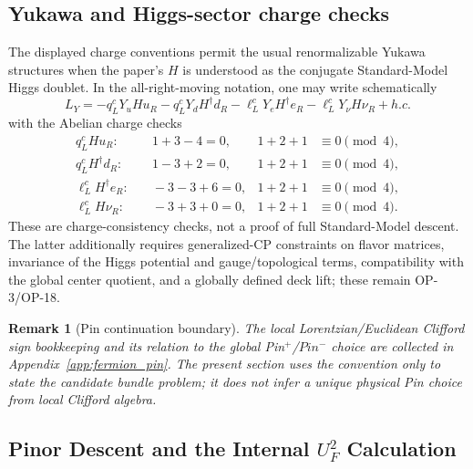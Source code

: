 \documentclass[11pt]{article}
\theoremstyle{canonmath}
\newtheorem{remark}[theorem]{Remark}
\theoremstyle{canonpostulate}
\theoremstyle{canonclaim}
\def\mathrm#1{#1}%
\def\mathcal#1{#1}%
\begin{document}
\subsection{Yukawa and Higgs-sector charge checks}
The displayed charge conventions permit the usual renormalizable Yukawa structures when the paper's $H$ is understood as the conjugate Standard-Model Higgs doublet. In the all-right-moving notation, one may write schematically
\begin{equation}
\mathcal L_Y=-q_L^cY_uHu_R-q_L^cY_dH^\dagger d_R-\ell_L^cY_eH^\dagger e_R-\ell_L^cY_\nu H\nu_R+\mathrm{h.c.}
\label{eq:yukawa}
\end{equation}
with the Abelian charge checks
\begin{equation}
\begin{aligned}
q_L^cHu_R:&\quad 1+3-4=0, &1+2+1&\equiv0\pmod4,\\
q_L^cH^\dagger d_R:&\quad 1-3+2=0, &1+2+1&\equiv0\pmod4,\\
\ell_L^cH^\dagger e_R:&\quad -3-3+6=0, &1+2+1&\equiv0\pmod4,\\
\ell_L^cH\nu_R:&\quad -3+3+0=0, &1+2+1&\equiv0\pmod4.
\end{aligned}
\end{equation}
These are charge-consistency checks, not a proof of full Standard-Model descent. The latter additionally requires generalized-CP constraints on flavor matrices, invariance of the Higgs potential and gauge/topological terms, compatibility with the global center quotient, and a globally defined deck lift; these remain OP-3/OP-18.

\begin{remark}[Pin continuation boundary]
The local Lorentzian/Euclidean Clifford sign bookkeeping and its relation to the global Pin$^+$/$Pin^-$ choice are collected in Appendix~\ref{app:fermion_pin}. The present section uses the convention only to state the candidate bundle problem; it does not infer a unique physical Pin choice from local Clifford algebra.
\end{remark}

\subsection{Pinor Descent and the Internal \texorpdfstring{$U_F^2$}{UF squared} Calculation}
\end{document}
